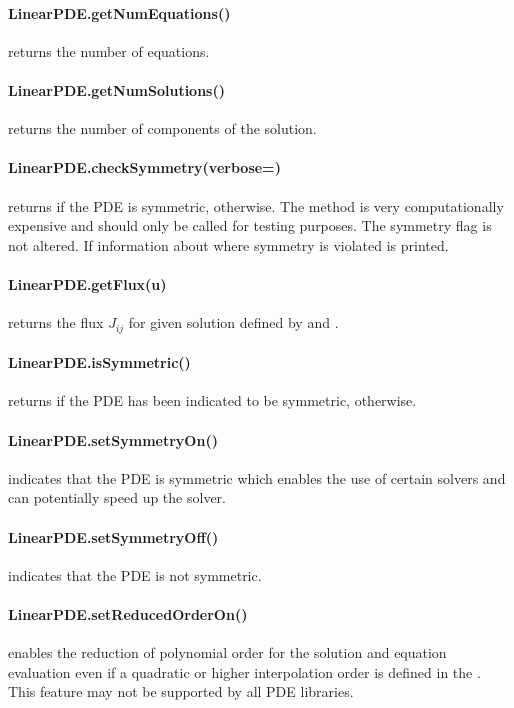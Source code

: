 \paragraph{LinearPDE.getNumEquations()}
returns the number of equations.


\paragraph{LinearPDE.getNumSolutions()}
returns the number of components of the solution.


\paragraph{LinearPDE.checkSymmetry(verbose=\False)}
returns \True if the PDE is symmetric, \False otherwise.
The method is very computationally expensive and should only be called for
testing purposes. The symmetry flag is not altered.
If  information about where symmetry is violated is printed.


\paragraph{LinearPDE.getFlux(u)}
returns the flux $J_{ij}$ for given solution  defined by
 and .


\paragraph{LinearPDE.isSymmetric()}
returns \True if the PDE has been indicated to be symmetric, \False otherwise.


\paragraph{LinearPDE.setSymmetryOn()}
indicates that the PDE is symmetric which enables the use of certain solvers
and can potentially speed up the solver.


\paragraph{LinearPDE.setSymmetryOff()}
indicates that the PDE is not symmetric.


\paragraph{LinearPDE.setReducedOrderOn()}
enables the reduction of polynomial order for the solution and equation
evaluation even if a quadratic or higher interpolation order is defined in the
\Domain. This feature may not be supported by all PDE libraries.


